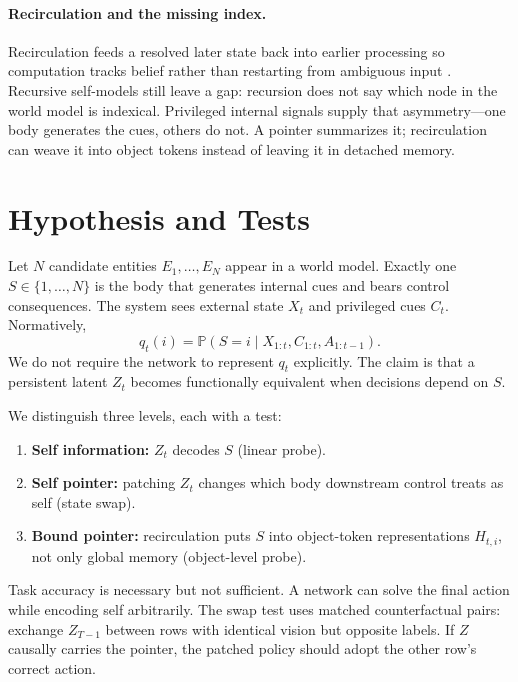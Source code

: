 \documentclass[11pt]{article}
\newcommand{\Pp}{\mathbb{P}}
\begin{document}
\paragraph{Recirculation and the missing index.}
Recirculation feeds a resolved later state back into earlier processing so computation tracks belief rather than restarting from ambiguous input \citep{mozer2026}. Recursive self-models \citep{zarncke2025,blanke2009} still leave a gap: recursion does not say which node in the world model is indexical. Privileged internal signals supply that asymmetry---one body generates the cues, others do not. A pointer summarizes it; recirculation can weave it into object tokens instead of leaving it in detached memory.

\section{Hypothesis and Tests}

Let $N$ candidate entities $E_1,\dots,E_N$ appear in a world model. Exactly one $S \in \{1,\dots,N\}$ is the body that generates internal cues and bears control consequences. The system sees external state $X_t$ and privileged cues $C_t$. Normatively,
\begin{equation}
q_t(i) = \Pp\!\left(S=i \mid X_{1:t},C_{1:t},A_{1:t-1}\right).
\end{equation}
We do not require the network to represent $q_t$ explicitly. The claim is that a persistent latent $Z_t$ becomes functionally equivalent when decisions depend on $S$.

We distinguish three levels, each with a test:
\begin{enumerate}
\item \textbf{Self information:} $Z_t$ decodes $S$ (linear probe).
\item \textbf{Self pointer:} patching $Z_t$ changes which body downstream control treats as self (state swap).
\item \textbf{Bound pointer:} recirculation puts $S$ into object-token representations $H_{t,i}$, not only global memory (object-level probe).
\end{enumerate}

Task accuracy is necessary but not sufficient. A network can solve the final action while encoding self arbitrarily. The swap test uses matched counterfactual pairs: exchange $Z_{T-1}$ between rows with identical vision but opposite labels. If $Z$ causally carries the pointer, the patched policy should adopt the other row's correct action.
\end{document}
